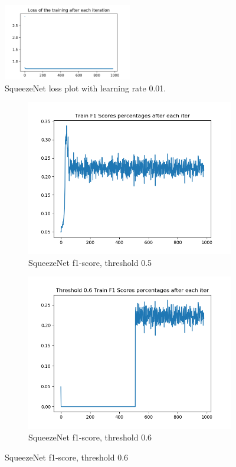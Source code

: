 \documentclass[12pt]{article}
\begin{document}
\begin{figure}[!ht]
\centering
\includegraphics[width=0.5\textwidth]{squeezenet-lazy-1-train-loss.png}
\caption{\label{squeezenet:squeezenet-lazy-1-train-loss}SqueezeNet loss plot with learning rate 0.01.}
\end{figure}

\begin{figure}[!ht]
\centering
\begin{subfigure}{.5\textwidth}
	\centering
	\includegraphics[width=1\linewidth]{squeezenet-lazy-1-train-scores-f1.png}
	\caption{\label{squeezenet:squeezenet-lazy-1-train-scores-f1}SqueezeNet f1-score, threshold 0.5}
\end{subfigure}%
\begin{subfigure}{.5\textwidth}
	\centering
	\includegraphics[width=1\linewidth]{squeezenet-lazy-1-train-scores-f1-6.png}
	\caption{\label{squeezenet:squeezenet-lazy-1-train-scores-f1-6}SqueezeNet f1-score, threshold 0.6}
\end{subfigure}
\end{figure}
\end{document}
